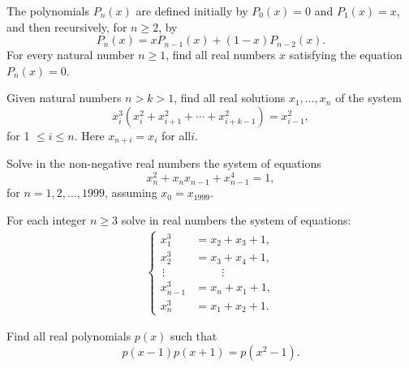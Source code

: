 \begin{question}[name={1996 Austrian--Polish}]
    The polynomials $P_{n}(x)$ are defined initially by $P_{0}(x)=0$ and $P_{1}(x)=x$, and then recursively, for $n\geq 2$, by
    \[P_{n}(x)=xP_{n-1}(x)+(1-x)P_{n-2}(x).\] For every natural number $n\geq 1$, find all real numbers $x$ satisfying the equation $P_{n}(x)=0$.
\end{question}




\begin{question}[name={1996 Austrian--Polish}]
    Given natural numbers $n > k > 1$, find all real solutions $x_1,\dots, x_n$ of the system $$x_i^3(x_i^2 + x_{i+1}^2+ \cdots +x_{i+k-1}^2) = x_{i-1}^2,$$ for 1 $\le i \le n$. Here $x_{n+i} = x_i$ for all$ i$.
\end{question}


\begin{question}[name={1999 Austrian--Polish}]
    Solve in the non-negative real numbers the system of equations
    \[x_n^2 + x_nx_{n-1} + x_{n-1}^4 = 1,\]
    for $n = 1,2,\dots,1999$, assuming $x_0 = x_{1999}$.
\end{question}


\begin{question}[name={2000 Austrian--Polish}]
    For each integer $n \ge 3$ solve in real numbers the system of equations:
    \begin{align*}
        \begin{cases}
            x_1^3 &= x_2 + x_3 + 1,\\
            x_2^3 &= x_3 + x_4 + 1,\\
            \, \vdots &\phantom{=} \quad\vdots\\
            x_{n-1}^3 &= x_n+ x_1 + 1,\\
            x_{n}^3 &= x_1+ x_2 + 1.
        \end{cases}
    \end{align*}
\end{question}



\begin{question}[name={2003 Austrian--Polish}]
    Find all real polynomials $p(x) $ such that \[p(x-1)p(x+1)= p(x^2-1).\]
\end{question}


